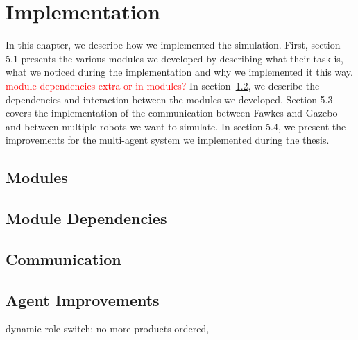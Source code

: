 \chapter{Implementation}
In this chapter, we describe how we implemented the simulation. First, section 5.1 presents the various modules we developed by describing what their task is, what we noticed during the implementation and why we implemented it this way. \textcolor{red}{module dependencies extra or in modules?} In section~\ref{sec:module_dependencies}, we describe the dependencies and interaction between the modules we developed. Section 5.3 covers the implementation of the communication between Fawkes and Gazebo and between multiple robots we want to simulate. In section 5.4, we present the improvements for the multi-agent system we implemented during the thesis.

\section{Modules}

\section{Module Dependencies}
\label{sec:module_dependencies}

\section{Communication}

\section{Agent Improvements}
dynamic role switch: no more products ordered, \cite{dynamic_role_assignment}
